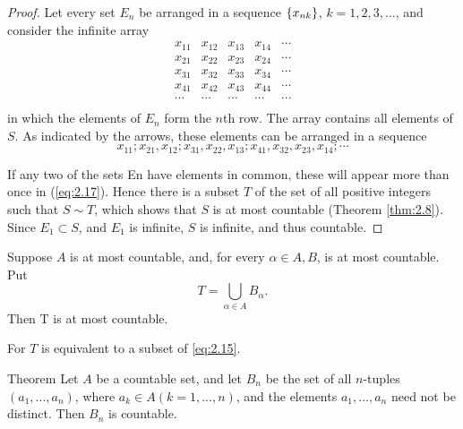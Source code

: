 \begin{proof}
    Let every set $E_n$ be arranged in a sequence $\protect\{x_{nk}\}$, 
    $k = 1,2,3,\dots$,
    and consider the infinite array
    \begin{equation}
        \label{eq:2.16}
        \begin{array}{ccccc}
            x_{11} & x_{12} & x_{13} & x_{14} & \cdots \\  
            x_{21} & x_{22} & x_{23} & x_{24} & \cdots \\  
            x_{31} & x_{32} & x_{33} & x_{34} & \cdots \\  
            x_{41} & x_{42} & x_{43} & x_{44} & \cdots \\  
            \cdots & \cdots & \cdots & \cdots & \cdots \\
        \end{array}
    \end{equation}
    in which the elements of $E_n$ form the $n$th row. 
    The array contains all elements of $S$.
    As indicated by the arrows, 
    these elements can be arranged in a sequence
    \begin{equation}
        \label{eq:2.17}
        x_{11};
        x_{21}, x_{12};
        x_{31}, x_{22}, x_{13};
        x_{41}, x_{32}, x_{23}, x_{14};
        \cdots
    \end{equation}
    
    If any two of the sets En have elements in common, 
    these will appear more than once in (\ref{eq:2.17}). 
    Hence there is a subset $T$ of the set of all positive integers 
    such that $S \sim T$, 
    which shows that $S$ is at most countable (Theorem \ref{thm:2.8}). 
    Since $E_1 \subset S$, and $E_1$ is infinite, 
    $S$ is infinite, and thus countable.
\end{proof}

\begin{myCorollary*}
    Suppose $A$ is at most countable, and, for every $\alpha \in A, B$, is at most countable. Put
    \begin{equation*}
        T = \bigcup_{\alpha\in A} B_\alpha.
    \end{equation*}
    Then T is at most countable.
\end{myCorollary*}

For $T$ is equivalent to a subset of \ref{eq:2.15}.

\begin{thm}
    \label{thm:2.13}
    Theorem Let $A$ be a countable set, and let $B_n$ be the set of all $n$-tuples $(a_1, ...,a_n)$, where $a_k \in  A (k=1,...,n)$, and the elements $a_1, ...,a_n$ need not be distinct. Then $B_n$ is countable.
\end{thm}

